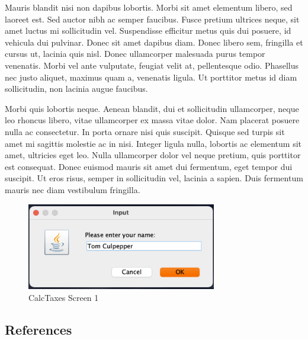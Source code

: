 \documentclass[\pandocDocMode,longtable, floatsintext, noextraspace]{apa6}
\begin{document}
Mauris blandit nisi non dapibus lobortis. Morbi sit amet elementum
libero, sed laoreet est. Sed auctor nibh ac semper faucibus. Fusce
pretium ultrices neque, sit amet luctus mi sollicitudin vel. Suspendisse
efficitur metus quis dui posuere, id vehicula dui pulvinar. Donec sit
amet dapibus diam. Donec libero sem, fringilla et cursus ut, lacinia
quis nisl. Donec ullamcorper malesuada purus tempor venenatis. Morbi vel
ante vulputate, feugiat velit at, pellentesque odio. Phasellus nec justo
aliquet, maximus quam a, venenatis ligula. Ut porttitor metus id diam
sollicitudin, non lacinia augue faucibus.

Morbi quis lobortis neque. Aenean blandit, dui et sollicitudin
ullamcorper, neque leo rhoncus libero, vitae ullamcorper ex massa vitae
dolor. Nam placerat posuere nulla ac consectetur. In porta ornare nisi
quis suscipit. Quisque sed turpis sit amet mi sagittis molestie ac in
nisi. Integer ligula nulla, lobortis ac elementum sit amet, ultricies
eget leo. Nulla ullamcorper dolor vel neque pretium, quis porttitor est
consequat. Donec euismod mauris sit amet dui fermentum, eget tempor dui
suscipit. Ut eros risus, semper in sollicitudin vel, lacinia a sapien.
Duis fermentum mauris nec diam vestibulum fringilla.

\begin{figure}
\hypertarget{fig:screen1}{%
\centering
\includegraphics[width=\textwidth,height=1.5in]{media/CSC310-Case1-1.png}
\caption{CalcTaxes Screen 1}\label{fig:screen1}
}
\end{figure}

\hypertarget{references}{%
\subsection{References}\label{references}}
\end{document}
